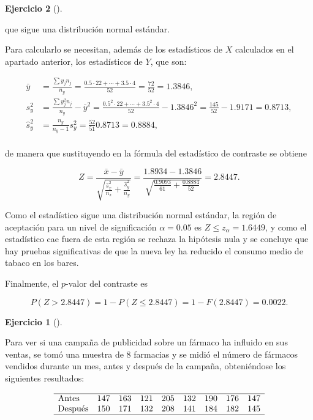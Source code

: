 \documentclass[
  a4paper,
]{scrreport}
\theoremstyle{definition}
\newtheorem{exercise}{Ejercicio}[chapter]
\theoremstyle{remark}
\begin{document}
\begin{exercise}[]
\begin{tcolorbox}
\begin{enumerate}
  que sigue una distribución normal estándar.

  Para calcularlo se necesitan, además de los estadísticos de \(X\)
  calculados en el apartado anterior, los estadísticos de \(Y\), que
  son:

  \begin{align*}
  \bar y &= \frac{\sum y_jn_j}{n_y} = \frac{0.5\cdot22+\cdots+3.5\cdot4}{52} = \frac{72}{52} = 1.3846,\\
  s_y^2 & = \frac{\sum y_j^2n_j}{n_y}-\bar y^2 = \frac{0.5^2\cdot22+\cdots+3.5^2\cdot4}{52} -1.3846^2= \frac{145}{52}-1.9171 = 0.8713,\\
  \hat s_y^2 &= \frac{n_y}{n_y-1}s_y^2 = \frac{52}{51}0.8713 = 0.8884,\\
  \end{align*}

  de manera que sustituyendo en la fórmula del estadístico de contraste
  se obtiene

  \[
  Z = \frac{\bar x -\bar y}{\sqrt{\frac{\hat s_x^2}{n_x}+\frac{\hat s_y^2}{n_y}}} 
  = \frac{1.8934-1.3846}{\sqrt{\frac{0.9093}{61}+\frac{0.8884}{52}}} = 2.8447.
  \]

  Como el estadístico sigue una distribución normal estándar, la región
  de aceptación para un nivel de significación \(\alpha=0.05\) es
  \(Z\leq z_\alpha=1.6449\), y como el estadístico cae fuera de esta
  región se rechaza la hipótesis nula y se concluye que hay pruebas
  significativas de que la nueva ley ha reducido el consumo medio de
  tabaco en los bares.

  Finalmente, el \(p\)-valor del contraste es

  \[
  P(Z>2.8447)= 1- P(Z\leq 2.8447) = 1 - F(2.8447) = 0.0022.
  \]
\end{enumerate}

\end{tcolorbox}

\begin{exercise}[]\protect\hypertarget{exr-contraste-medias-ventas}{}\label{exr-contraste-medias-ventas}

Para ver si una campaña de publicidad sobre un fármaco ha influido en
sus ventas, se tomó una muestra de \(8\) farmacias y se midió el número
de fármacos vendidos durante un mes, antes y después de la campaña,
obteniéndose los siguientes resultados:

\[
\begin{array}{lcccccccc}
\hline
\mbox{Antes} & 147 & 163 & 121 & 205 & 132 & 190 & 176 & 147  \\
\mbox{Después} & 150 & 171 & 132 & 208 & 141 & 184 & 182 & 145  \\
\hline
\end{array}
\]


\end{exercise}
\end{exercise}
\end{document}
